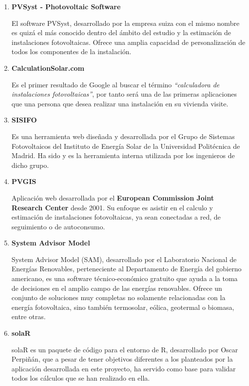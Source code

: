 \begin{enumerate}
\item \textbf{PVSyst - Photovoltaic Software}

El software PVSyst, desarrollado por la empresa suiza con el mismo nombre es quizá el más conocido dentro del ámbito del estudio y la estimación de instalaciones fotovoltaicas. Ofrece una amplia capacidad de personalización de todos los componentes de la instalación.

\item \textbf{CalculationSolar.com}

Es el primer resultado de Google al buscar el término \textit{``calculadora de instalaciones fotovoltaicas''}, por tanto será una de las primeras aplicaciones que una persona que desea realizar una instalación en su vivienda visite.

\item \textbf{SISIFO}

Es una herramienta web diseñada y desarrollada por el Grupo de Sistemas Fotovoltaicos del Instituto de Energía Solar de la Universidad Politécnica de Madrid. Ha sido y es la herramienta interna utilizada por los ingenieros de dicho grupo.

\item \textbf{PVGIS}

Aplicación web desarrollada por el \textbf{European Commission Joint Research Center} desde 2001. Su enfoque es asistir en el calculo y estimación de instalaciones fotovoltaicas, ya sean conectadas a red, de seguimiento o de autoconsumo.

\item \textbf{System Advisor Model}

System Advisor Model (SAM), desarrollado por el Laboratorio Nacional de Energías Renovables, perteneciente al Departamento de Energía del gobierno americano, es una software técnico-económico gratuito que ayuda a la toma de decisiones en el amplio campo de las energías renovables. Ofrece un conjunto de soluciones muy completas no solamente relacionadas con la energía fotovoltaica, sino también termosolar, eólica, geotermal o biomasa, entre otras.

\item \textbf{solaR}

solaR es un paquete de código para el entorno de R, desarrollado por Oscar Perpiñán, que a pesar de tener objetivos diferentes a los planteados por la aplicación desarrollada en este proyecto, ha servido como base para validar todos los cálculos que se han realizado en ella.
\end{enumerate}

